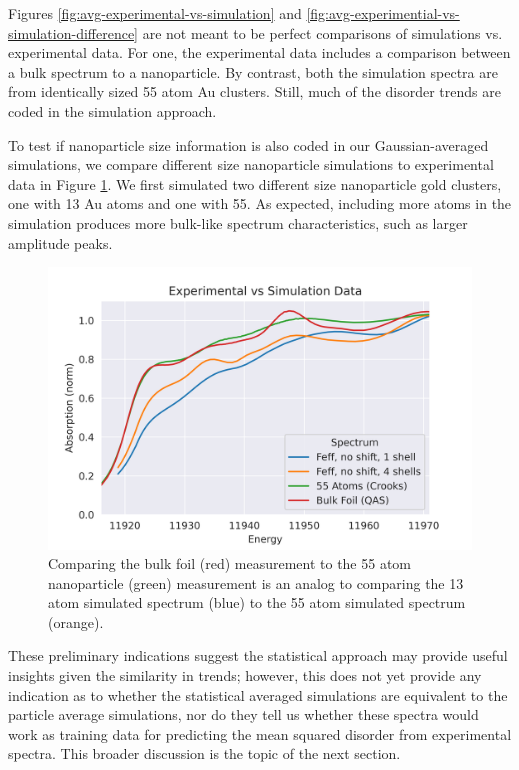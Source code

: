 Figures \ref{fig:avg-experimental-vs-simulation} and \ref{fig:avg-experimential-vs-simulation-difference} are not meant to be perfect comparisons of simulations vs. experimental data. For one, the experimental data includes a comparison between a bulk spectrum to a nanoparticle. By contrast, both the simulation spectra are from identically sized 55 atom  Au clusters. Still, much of the disorder trends are coded in the simulation approach. 

To test if nanoparticle size information is also coded in our Gaussian-averaged simulations, we compare different size nanoparticle simulations to experimental data in Figure \ref{fig:avg-experimental-vs-simulation2}. We first simulated two different size nanoparticle gold clusters, one with 13 Au atoms and one with 55. As expected, including more atoms in the simulation produces more bulk-like spectrum characteristics, such as larger amplitude peaks.

\begin{figure}[h]
	\centering
	\includegraphics[width=.7\linewidth]{Chapters/Figures/Bulk_55atom_experimental_theory_comparison.png}
	\caption[Simulation vs. Experimental 2]{Comparing the bulk foil (red) measurement to the 55 atom nanoparticle (green) measurement is an analog to comparing the 13 atom simulated spectrum (blue) to the 55 atom simulated spectrum (orange).}
	\label{fig:avg-experimental-vs-simulation2}
\end{figure}


These preliminary indications suggest the statistical approach may provide useful insights given the similarity in trends; however, this does not yet provide any indication as to whether the statistical averaged simulations are equivalent to the particle average simulations, nor do they tell us whether these spectra would work as training data for predicting the mean squared disorder from experimental spectra. This broader discussion is the topic of the next section.


